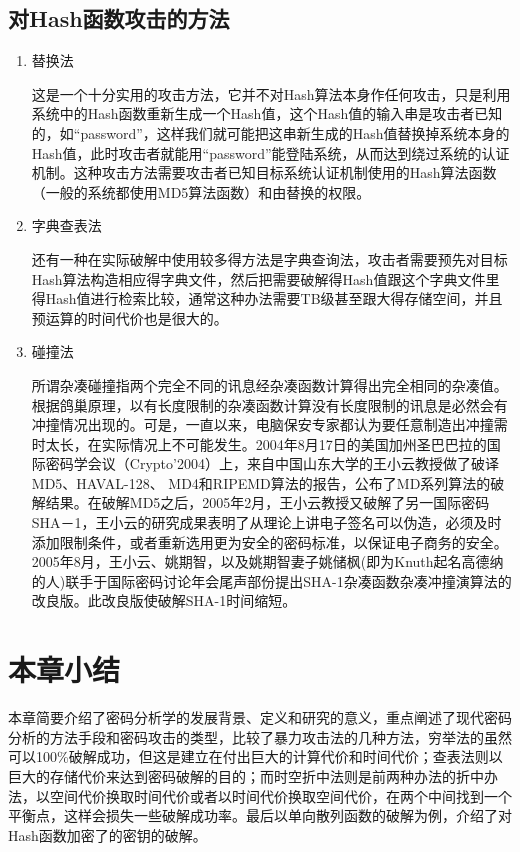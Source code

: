 \subsection{对Hash函数攻击的方法}
\begin{enumerate}
\item 替换法

这是一个十分实用的攻击方法，它并不对Hash算法本身作任何攻击，只是利用系统中的Hash函数重新生成一个Hash值，这个Hash值的输入串是攻击者已知的，如“password”，这样我们就可能把这串新生成的Hash值替换掉系统本身的Hash值，此时攻击者就能用“password”能登陆系统，从而达到绕过系统的认证机制。这种攻击方法需要攻击者已知目标系统认证机制使用的Hash算法函数（一般的系统都使用MD5算法函数）和由替换的权限。
\item 字典查表法

还有一种在实际破解中使用较多得方法是字典查询法，攻击者需要预先对目标Hash算法构造相应得字典文件，然后把需要破解得Hash值跟这个字典文件里得Hash值进行检索比较，通常这种办法需要TB级甚至跟大得存储空间，并且预运算的时间代价也是很大的。
\item 碰撞法

所谓杂凑碰撞指两个完全不同的讯息经杂凑函数计算得出完全相同的杂凑值。根据鸽巢原理，以有长度限制的杂凑函数计算没有长度限制的讯息是必然会有冲撞情况出现的。可是，一直以来，电脑保安专家都认为要任意制造出冲撞需时太长，在实际情况上不可能发生。2004年8月17日的美国加州圣巴巴拉的国际密码学会议（Crypto’2004）上，来自中国山东大学的王小云教授做了破译MD5、HAVAL-128、 MD4和RIPEMD算法的报告，公布了MD系列算法的破解结果。在破解MD5之后，2005年2月，王小云教授又破解了另一国际密码SHA－1，王小云的研究成果表明了从理论上讲电子签名可以伪造，必须及时添加限制条件，或者重新选用更为安全的密码标准，以保证电子商务的安全。2005年8月，王小云、姚期智，以及姚期智妻子姚储枫(即为Knuth起名高德纳的人)联手于国际密码讨论年会尾声部份提出SHA-1杂凑函数杂凑冲撞演算法的改良版。此改良版使破解SHA-1时间缩短。
\end{enumerate}
\section{本章小结}
本章简要介绍了密码分析学的发展背景、定义和研究的意义，重点阐述了现代密码分析的方法手段和密码攻击的类型，比较了暴力攻击法的几种方法，穷举法的虽然可以100\%破解成功，但这是建立在付出巨大的计算代价和时间代价；查表法则以巨大的存储代价来达到密码破解的目的；而时空折中法则是前两种办法的折中办法，以空间代价换取时间代价或者以时间代价换取空间代价，在两个中间找到一个平衡点，这样会损失一些破解成功率。最后以单向散列函数的破解为例，介绍了对Hash函数加密了的密钥的破解。
